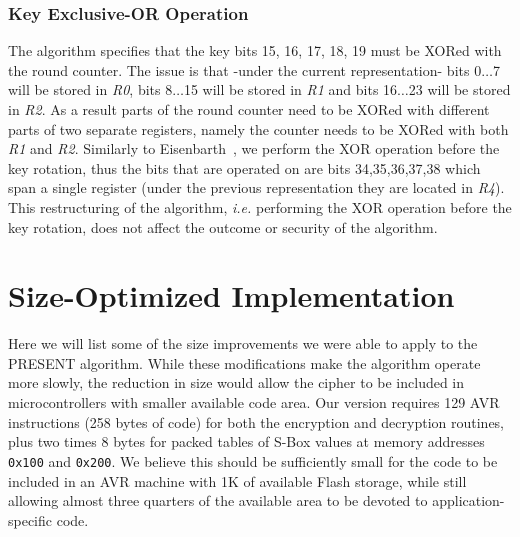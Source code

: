 \documentclass[11pt]{llncs2e} %
\begin{document}
\subsubsection{Key Exclusive-OR Operation} \label{key_xor}
The algorithm specifies that the key bits 15, 16, 17, 18, 19 must be XORed with the round counter. The issue is that -under the current representation- bits 0$\dots$7 will be stored in \textit{R0}, bits 8$\dots$15 will be stored in \textit{R1} and bits 16$\dots$23 will be stored in \textit{R2}.
As a result parts of the round counter need to be XORed with different parts of two separate registers, namely the counter needs to be XORed with both \textit{R1} and \textit{R2}.
Similarly to Eisenbarth~\cite{eisenbarth2012compact}, we perform the XOR operation before the key rotation, thus the bits that are operated on are bits 34,35,36,37,38 which span a single register (under the previous representation they are located in \textit{R4}). This restructuring of the algorithm, \emph{i.e.} performing the XOR operation before the key rotation, does not affect the outcome or security of the algorithm. 



\section{Size-Optimized Implementation}

Here we will list some of the size improvements we were able to apply to the PRESENT algorithm.
While these modifications make the algorithm operate more slowly, the reduction in size would allow the cipher to be included in microcontrollers with smaller available code area.
Our version requires 129 AVR instructions (258 bytes of code) for both the encryption and decryption routines, plus two times 8 bytes for packed tables of S-Box values at memory addresses \texttt{0x100} and \texttt{0x200}.
We believe this should be sufficiently small for the code to be included in an AVR machine with 1K of available Flash storage, while still allowing almost three quarters of the available area to be devoted to application-specific code.
\end{document}
